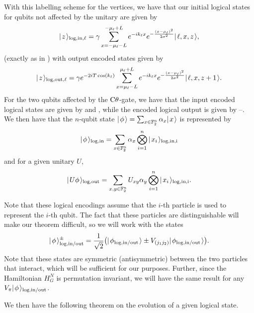 \documentclass[../thesis-main/thesis-main]{subfiles}
\begin{document}
With this labelling scheme for the vertices, we have that our initial logical states for qubits not affected by the unitary are given by
\begin{align}
  |\mspace{2mu} z \mspace{2mu} \rangle_{\text{log},\text{in},\ell} = \gamma \sum_{x = -\mu_\ell-L}^{-\mu_\ell + L} e^{- i k_\ell x} e^{ - \frac{(x-\mu_\ell)^2}{2\sigma^2}} |\mspace{2mu} \ell,x,z \mspace{2mu} \rangle,
\end{align}
(exactly as in ) with output encoded states given by
\begin{align}
  |\mspace{2mu} z \mspace{2mu} \rangle_{\text{log},\text{out},\ell} = \gamma e^{-2i T \cos(k_\ell)} \sum_{x = \mu_\ell-L}^{\mu_\ell + L} e^{- i k_\ell x} e^{ - \frac{(x-\mu_\ell)^2}{2\sigma^2}} |\mspace{2mu} \ell,x,z+1 \mspace{2mu} \rangle.
\end{align}
For the two qubits affected by the $\mathrm{C}\theta$-gate, we have that the input encoded logical states are given by  and , while the encoded logical output is given by --.  We then have that the $n$-qubit state $|\mspace{2mu} \phi \mspace{2mu} \rangle = \sum_{x\in \mathbb{F}_2^n} \alpha_x|\mspace{2mu} x \mspace{2mu} \rangle$ is represented by
\begin{align}
  |\mspace{2mu} \phi \mspace{2mu} \rangle_{\text{log,in}} = \sum_{x\in \mathbb{F}_2^n} \alpha_{x} \bigotimes_{i=1}^n |\mspace{2mu} x_i \mspace{2mu} \rangle_{\text{log},\text{in,i}}\label{eq:MP_two_input_encoding}
\end{align}
and for a given unitary $U$,
\begin{align}
  |\mspace{2mu} U\phi \mspace{2mu} \rangle_{\text{log,out}} = \sum_{x,y\in \mathbb{F}_2^n} U_{xy}\alpha_{y} \bigotimes_{i=1}^n |\mspace{2mu} x_i \mspace{2mu} \rangle_{\text{log},\text{in,i}}.\label{eq:MP_two_output_encoding}
\end{align}

Note that these logical encodings assume that the $i$-th particle is used to represent the $i$-th qubit.  The fact that these particles are distinguishable will make our theorem difficult, so we will work with the states
\begin{align}
  |\mspace{2mu} \phi \mspace{2mu} \rangle_{\text{log,in/out}}^{\pm} = \frac{1}{\sqrt{2}} \big(|\mspace{2mu} \phi_{\text{log,in/out}} \mspace{2mu} \rangle \pm V_{(j_1j_2)} |\mspace{2mu} \phi_{\text{log,in/out}} \mspace{2mu} \rangle\big). 
\end{align}
Note that these states are symmetric (antisymmetric) between the two particles that interact, which will be sufficient for our purposes.  Further, since the Hamiltonian $H_{G}^N$ is permutation invariant, we will have the same result for any $V_\pi |\mspace{2mu} \phi \mspace{2mu} \rangle_{\text{log,in/out}}$.


We then have the following theorem on the evolution of a given logical state.
\end{document}
